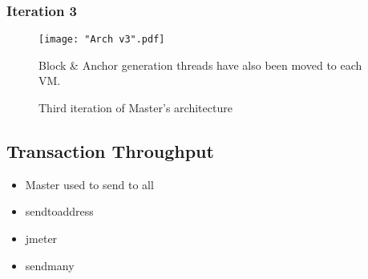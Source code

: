 
\newpage
\subsubsection{Iteration 3} \label{impl-arch-3}

\begin{figure}[!htb]
    \centering
    \texttt{[image: "Arch v3".pdf]}
    \caption{Third iteration of Master's architecture}
    
    \medskip
    \footnotesize
    Block \& Anchor generation threads have also been moved to each VM.
    \label{fig-impl-arch-3}
\end{figure}



\newpage
\subsection{Transaction Throughput} \label{impl-testbed-arch}


\begin{itemize}

    \item Master used to send to all
    \item sendtoaddress
    \item jmeter
    \item sendmany

\end{itemize}

